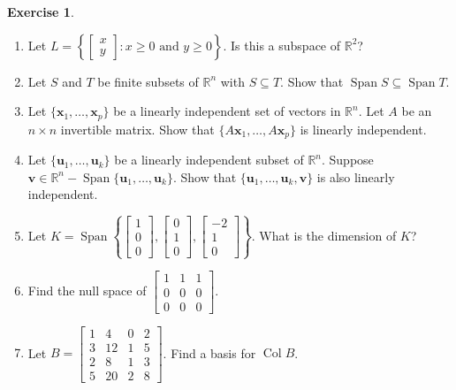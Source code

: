 \documentclass[12pt,letterpaper]{book}
\numberwithin{equation}{section}
\theoremstyle{definition}
\newtheorem{exercise}{\textbf{Exercise}}[chapter]
\newcommand{\vu}{\bm{u}}
\newcommand{\vv}{\bm{v}}
\newcommand{\Coll}{\operatorname{Col}}
\newcommand{\Span}{\operatorname{Span}}
\begin{document}
\begin{exercise}\label{matalgexer}\quad
\begin{enumerate}[\bfseries 1.]
\item Let $L=\left\{\left[\begin{array}{c} x \\ y \end{array}\right]:x\geq 0 \text{ and } y\geq 0\right\}$. Is this
a subspace of $\mathbb{R}^2$?
\item\label{SinT} Let $S$ and $T$ be finite subsets of $\mathbb{R}^n$ with $S\subseteq T$. Show that $\Span S\subseteq \Span T$.
\item Let $\{\bm{x}_1,\ldots,\bm{x}_p\}$ be a linearly independent set of vectors in $\mathbb{R}^n$. Let $A$ be an $n\times n$ invertible matrix. Show that $\{A\bm{x}_1,\ldots, A\bm{x}_p\}$ is linearly independent.

\item Let $\{\vu_1,\ldots,\vu_k\}$ be a linearly independent subset of $\mathbb{R}^n$. Suppose $\vv \in\mathbb{R}^n - \Span \{\vu_1,\ldots,\vu_k\}$. Show that $\{\vu_1,\ldots,\vu_k, \vv\}$ is also linearly independent.

\item Let $K=\Span\left\{\left[\begin{array}{r} 1 \\ 0 \\
0 \end{array}\right],\left[\begin{array}{r} 0 \\ 1 \\ 0
\end{array}\right],\left[\begin{array}{r} -2 \\ 1 \\ 0
\end{array}\right]\right\}$. What is the dimension of
$K$?

\item Find the null space of $\left[\begin{array}{rrr} 1 & 1 & 1 \\
0 & 0 & 0
\\ 0 & 0 & 0 \end{array}\right]$.

\item Let $B=\left[\begin{array}{rrrrr} 1 & 4 & 0 & 2 \\
3 & 12 & 1 & 5 \\ 2 & 8 & 1 & 3 \\ 5 & 20 & 2 & 8
\end{array}\right]$. Find a basis for $\Coll B$.


\end{enumerate}
\end{exercise}
\end{document}
